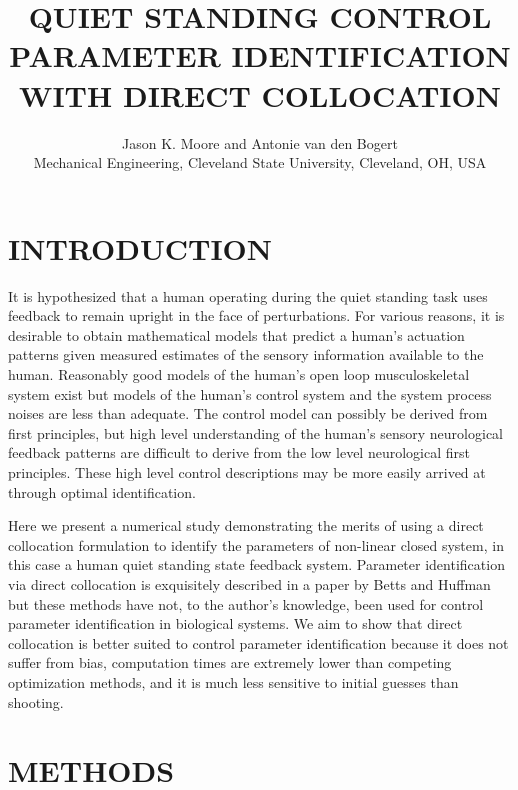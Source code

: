 \documentclass[11pt,a4paper,twocolumn]{article}
\title{\textbf{QUIET STANDING CONTROL PARAMETER IDENTIFICATION WITH DIRECT
  COLLOCATION}}
\author{Jason K. Moore and Antonie van den Bogert\\
Mechanical Engineering, Cleveland State University, Cleveland, OH, USA}
\date{}
\begin{document}
\maketitle

\thispagestyle{firststyle}

\section*{INTRODUCTION}

It is hypothesized that a human operating during the quiet standing task uses
feedback to remain upright in the face of perturbations. For various reasons,
it is desirable to obtain mathematical models that predict a human's actuation
patterns given measured estimates of the sensory information available to the
human. Reasonably good models of the human's open loop musculoskeletal system
exist but models of the human's control system and the system process noises
are less than adequate. The control model can possibly be derived from first
principles, but high level understanding of the human's sensory neurological
feedback patterns are difficult to derive from the low level neurological first
principles. These high level control descriptions may be more easily arrived at
through optimal identification.

Here we present a numerical study demonstrating the merits of using a direct
collocation formulation to identify the parameters of non-linear closed
system, in this case a human quiet standing state feedback system. Parameter
identification via direct collocation is exquisitely described in a paper by
Betts and Huffman~\cite{Betts2003} but these methods have not, to the author's
knowledge, been used for control parameter identification in biological
systems. We aim to show that direct collocation is better suited to control
parameter identification because it does not suffer from bias, computation
times are extremely lower than competing optimization methods, and it is much
less sensitive to initial guesses than shooting.

\section*{METHODS}
\end{document}
